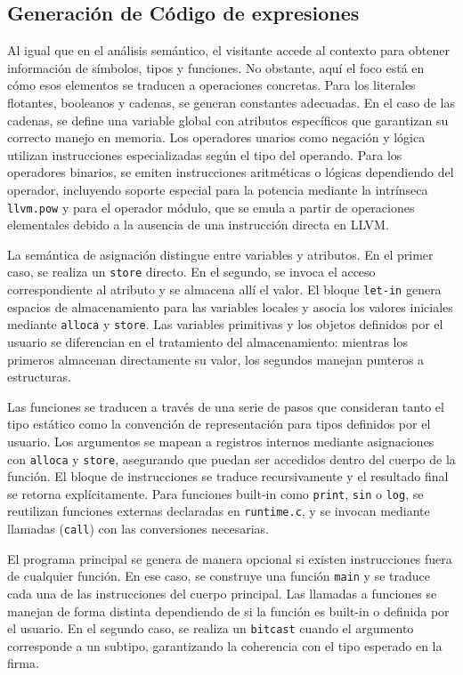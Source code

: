 \documentclass{llncs}
\begin{document}
	\subsection{Generación de Código de expresiones}

	Al igual que en el análisis semántico, el visitante accede al contexto para obtener información de símbolos, tipos y funciones. No obstante, aquí el foco está en cómo esos elementos se traducen a operaciones concretas. Para los literales flotantes, booleanos y cadenas, se generan constantes adecuadas. En el caso de las cadenas, se define una variable global con atributos específicos que garantizan su correcto manejo en memoria. Los operadores unarios como negación y lógica utilizan instrucciones especializadas según el tipo del operando. Para los operadores binarios, se emiten instrucciones aritméticas o lógicas dependiendo del operador, incluyendo soporte especial para la potencia mediante la intrínseca \texttt{llvm.pow} y para el operador módulo, que se emula a partir de operaciones elementales debido a la ausencia de una instrucción directa en LLVM.

	La semántica de asignación distingue entre variables y atributos. En el primer caso, se realiza un \texttt{store} directo. En el segundo, se invoca el acceso correspondiente al atributo y se almacena allí el valor. El bloque \texttt{let-in} genera espacios de almacenamiento para las variables locales y asocia los valores iniciales mediante \texttt{alloca} y \texttt{store}. Las variables primitivas y los objetos definidos por el usuario se diferencian en el tratamiento del almacenamiento: mientras los primeros almacenan directamente su valor, los segundos manejan punteros a estructuras.

	Las funciones se traducen a través de una serie de pasos que consideran tanto el tipo estático como la convención de representación para tipos definidos por el usuario. Los argumentos se mapean a registros internos mediante asignaciones con \texttt{alloca} y \texttt{store}, asegurando que puedan ser accedidos dentro del cuerpo de la función. El bloque de instrucciones se traduce recursivamente y el resultado final se retorna explícitamente. Para funciones built-in como \texttt{print}, \texttt{sin} o \texttt{log}, se reutilizan funciones externas declaradas en \texttt{runtime.c}, y se invocan mediante llamadas (\texttt{call}) con las conversiones necesarias.

	El programa principal se genera de manera opcional si existen instrucciones fuera de cualquier función. En ese caso, se construye una función \texttt{main} y se traduce cada una de las instrucciones del cuerpo principal. Las llamadas a funciones se manejan de forma distinta dependiendo de si la función es built-in o definida por el usuario. En el segundo caso, se realiza un \texttt{bitcast} cuando el argumento corresponde a un subtipo, garantizando la coherencia con el tipo esperado en la firma.
\end{document}
